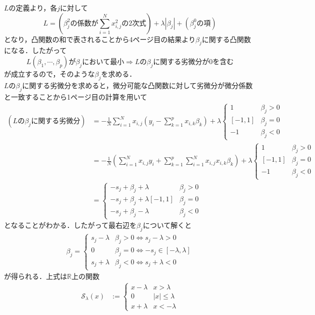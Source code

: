 \documentclass{jsarticle}
\theoremstyle{definition}
\theoremstyle{mystyle} %
\begin{document}
$L$の定義より，各$j$に対して
$$L = \left(\beta_j^2の係数が\sum_{i=1}^Nx_{i,j}^2の2次式\right)+\lambda|\beta_j|+(\beta_j^0の項)$$
となり，凸関数の和で表されることから4ページ目の結果より$\beta_j$に関する凸関数になる．したがって
$$L(\beta_1,\cdots,\beta_p)が \beta_j において最小\Rightarrow Lの \beta_j に関する劣微分が0を含む$$
が成立するので，そのような$\beta_j$を求める．\\
$L$の$\beta_j$に関する劣微分を求めると，微分可能な凸関数に対して劣微分が微分係数と一致することから1ページ目の計算を用いて
\begin{align*}
(Lの\beta_jに関する劣微分) &=-\frac{1}{N}\sum_{i=1}^N x_{i,j}\left(y_i-\sum_{k=1}^p x_{i,k}\beta_k\right)+ \lambda\begin{cases}
1 & \beta_j>0\\
[-1,1] & \beta_j = 0\\
-1 & \beta_j< 0
\end{cases}\\
&=-\frac{1}{N}\left(\sum_{i=1}^N x_{i,j}y_i +\sum_{k=1}^p\sum_{i=1}^Nx_{i,j}x_{i,k} \beta_k\right)+\lambda\begin{cases}
1 & \beta_j>0\\
[-1,1] & \beta_j = 0\\
-1 & \beta_j< 0
\end{cases}\\
&=\begin{cases}
-s_j + \beta_j + \lambda & \beta_j>0\\
-s_j + \beta_j+\lambda[-1,1] & \beta_j = 0\\
-s_j + \beta_j  -\lambda & \beta_j<0
\end{cases}
\end{align*}
となることがわかる．したがって最右辺を$\beta_j$について解くと
\begin{align*}
\beta_j =\begin{cases}
s_j-\lambda & \beta_j>0\Leftrightarrow s_j-\lambda >0\\
0 & \beta_j = 0\Leftrightarrow -s_j\in [-\lambda,\lambda]\\
s_j + \lambda & \beta_j<0\Leftrightarrow s_j+\lambda<0
\end{cases}
\end{align*}
が得られる．上式は$\mathbb{R}$上の関数
\begin{align}
\tag{1.11}
\mathcal{S}_{\lambda}(x) &:=\begin{cases}
x-\lambda & x>\lambda\\
0 & |x|\leq \lambda\\
x+\lambda & x<-\lambda
\end{cases}
\end{align}
\end{document}
